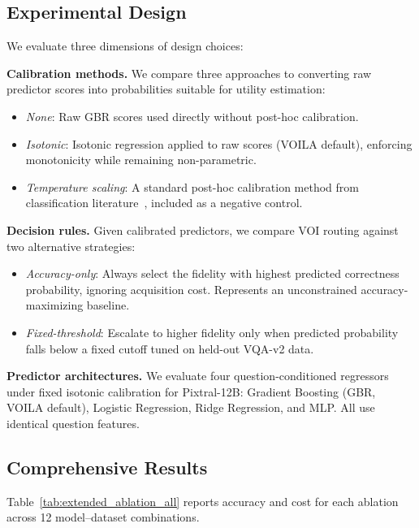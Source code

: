 \subsection{Experimental Design}
\label{sec:ablation_design}

We evaluate three dimensions of design choices:

\textbf{Calibration methods.} We compare three approaches to converting raw predictor scores into probabilities suitable for utility estimation:
\begin{itemize}[leftmargin=*,nosep]
\item \textit{None}: Raw GBR scores used directly without post-hoc calibration.
\item \textit{Isotonic}: Isotonic regression applied to raw scores (\textsc{VOILA} default), enforcing monotonicity while remaining non-parametric.
\item \textit{Temperature scaling}: A standard post-hoc calibration method from classification literature~\cite{guo2017calibrationmodernneuralnetworks}, included as a negative control.
\end{itemize}

\textbf{Decision rules.} Given calibrated predictors, we compare VOI routing against two alternative strategies:
\begin{itemize}[leftmargin=*,nosep]
\item \textit{Accuracy-only}: Always select the fidelity with highest predicted correctness probability, ignoring acquisition cost. Represents an unconstrained accuracy-maximizing baseline.
\item \textit{Fixed-threshold}: Escalate to higher fidelity only when predicted probability falls below a fixed cutoff tuned on held-out VQA-v2 data.
\end{itemize}

\textbf{Predictor architectures.} We evaluate four question-conditioned regressors under fixed isotonic calibration for Pixtral-12B: Gradient Boosting (GBR, \textsc{VOILA} default), Logistic Regression, Ridge Regression, and MLP. All use identical question features.

\subsection{Comprehensive Results}
\label{sec:ablation_results}

Table~\ref{tab:extended_ablation_all} reports accuracy and cost for each ablation across 12 model--dataset combinations.

